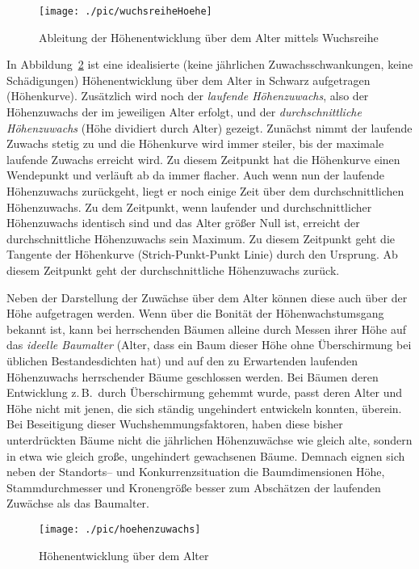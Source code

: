 \documentclass[twocolumn]{scrartcl}
\begin{document}
\begin{figure}[htbp]
  \centering
  \texttt{[image: ./pic/wuchsreiheHoehe]}
  \caption{Ableitung der Höhenentwicklung über dem Alter mittels Wuchsreihe}
  \label{fig:wuchsreiheHoehe}
\end{figure}

In Abbildung~\ref{fig:hoeheAlter} ist eine idealisierte (keine jährlichen
Zuwachsschwankungen, keine Schädigungen) Höhenentwicklung über dem Alter in
Schwarz aufgetragen (Höhenkurve). Zusätzlich wird noch der \emph{laufende
Höhenzuwachs}, also der Höhenzuwachs der im jeweiligen
Alter erfolgt, und der \emph{durchschnittliche
Höhenzuwachs} (Höhe dividiert durch Alter)
gezeigt. Zunächst nimmt der laufende Zuwachs stetig zu und die Höhenkurve wird
immer steiler, bis der maximale laufende Zuwachs erreicht wird. Zu diesem
Zeitpunkt hat die Höhenkurve einen Wendepunkt und verläuft ab da immer flacher.
Auch wenn nun der laufende Höhenzuwachs zurückgeht, liegt er noch einige Zeit
über dem durchschnittlichen Höhenzuwachs. Zu dem Zeitpunkt, wenn laufender und
durchschnittlicher Höhenzuwachs identisch sind und das Alter größer Null ist,
erreicht der durchschnittliche Höhenzuwachs sein Maximum. Zu diesem Zeitpunkt
geht die Tangente der Höhenkurve (Strich-Punkt-Punkt Linie) durch den Ursprung.
Ab diesem Zeitpunkt geht der durchschnittliche Höhenzuwachs zurück.

Neben der Darstellung der Zuwächse über dem Alter können diese auch über der
Höhe aufgetragen werden. Wenn über die Bonität der Höhenwachstumsgang bekannt
ist, kann bei herrschenden Bäumen alleine durch Messen ihrer Höhe auf das
\emph{ideelle Baumalter} (Alter, dass ein Baum dieser Höhe ohne Überschirmung
bei üblichen Bestandesdichten hat) und auf den zu Erwartenden laufenden
Höhenzuwachs herrschender Bäume geschlossen werden. Bei Bäumen deren
Entwicklung z.\,B.\ durch Überschirmung gehemmt wurde, passt deren Alter und
Höhe nicht mit jenen, die sich ständig ungehindert entwickeln konnten, überein.
Bei Beseitigung dieser Wuchshemmungsfaktoren, haben diese bisher unterdrückten
Bäume nicht die jährlichen Höhenzuwächse wie gleich alte, sondern in etwa wie
gleich große, ungehindert gewachsenen Bäume. Demnach eignen sich neben der
Standorts-- und Konkurrenzsituation die Baumdimensionen Höhe, Stammdurchmesser
und Kronengröße besser zum Abschätzen der laufenden Zuwächse als das Baumalter.

\begin{figure}[htbp]
  \centering
  \texttt{[image: ./pic/hoehenzuwachs]}
  \caption{Höhenentwicklung über dem Alter}
  \label{fig:hoeheAlter}
\end{figure}
\end{document}
